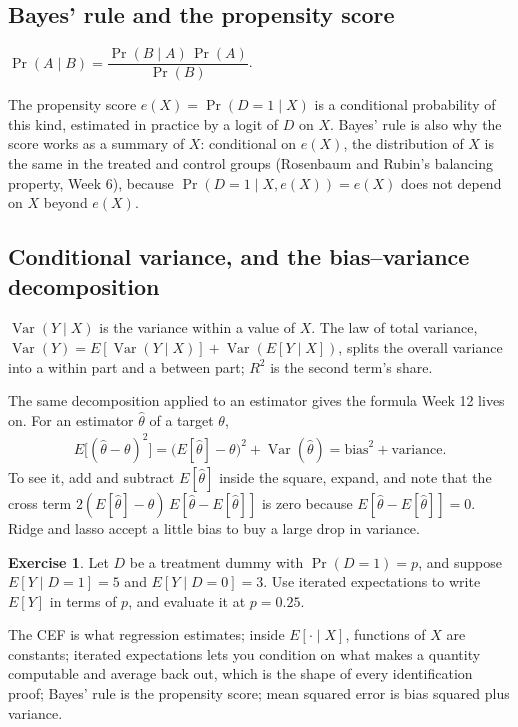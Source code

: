 \documentclass[11pt]{article}
\theoremstyle{definition}
\newtheorem{exercise}{Exercise}
\DeclareMathOperator{\Var}{Var}
\newcommand{\E}{E}
\begin{document}
\subsection{Bayes' rule and the propensity score}

\begin{rulebox}[Bayes]
$\Pr(A \mid B) = \dfrac{\Pr(B \mid A)\,\Pr(A)}{\Pr(B)}$.
\end{rulebox}
The propensity score $e(X) = \Pr(D = 1 \mid X)$ is a conditional
probability of this kind, estimated in practice by a logit of $D$ on $X$.
Bayes' rule is also why the score works as a summary of $X$: conditional on
$e(X)$, the distribution of $X$ is the same in the treated and control
groups (Rosenbaum and Rubin's balancing property, Week 6), because
$\Pr(D = 1 \mid X, e(X)) = e(X)$ does not depend on $X$ beyond $e(X)$.

\subsection{Conditional variance, and the bias--variance decomposition}

$\Var(Y \mid X)$ is the variance within a value of $X$. The law of total
variance, $\Var(Y) = \E[\Var(Y \mid X)] + \Var(\E[Y \mid X])$, splits the
overall variance into a within part and a between part; $R^2$ is the second
term's share.

The same decomposition applied to an estimator gives the formula Week 12
lives on. For an estimator $\hat\theta$ of a target $\theta$,
\begin{align*}
  \E\big[(\hat\theta - \theta)^2\big]
  = \big(\E[\hat\theta] - \theta\big)^2 + \Var(\hat\theta)
  = \text{bias}^2 + \text{variance}.
\end{align*}
To see it, add and subtract $\E[\hat\theta]$ inside the square, expand, and
note that the cross term $2(\E[\hat\theta] - \theta)\,\E[\hat\theta -
\E[\hat\theta]]$ is zero because $\E[\hat\theta - \E[\hat\theta]] = 0$.
Ridge and lasso accept a little bias to buy a large drop in variance.

\begin{exercise}
Let $D$ be a treatment dummy with $\Pr(D = 1) = p$, and suppose
$\E[Y \mid D = 1] = 5$ and $\E[Y \mid D = 0] = 3$. Use iterated
expectations to write $\E[Y]$ in terms of $p$, and evaluate it at
$p = 0.25$.
\end{exercise}

\begin{takeaway}
The CEF is what regression estimates; inside $\E[\cdot \mid X]$, functions
of $X$ are constants; iterated expectations lets you condition on what
makes a quantity computable and average back out, which is the shape of
every identification proof; Bayes' rule is the propensity score; mean
squared error is bias squared plus variance.
\end{takeaway}
\end{document}
